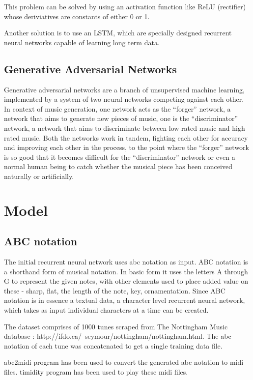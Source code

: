\documentclass[11pt]{article}
\begin{document}
This problem can be solved by using an activation function like ReLU (rectifier) whose deriviatives are constants of either 0 or 1.

Another solution is to use an LSTM, which are specially designed recurrent neural networks capable of learning long term data.

\subsection{Generative Adversarial Networks}
Generative adversarial networks are a branch of unsupervised machine learning, implemented by a system of two neural networks competing against each other. In context of music generation, one network acts as the “forger” network, a network that aims to generate new pieces of music, one is the “discriminator” network, a network that aims to discriminate between low rated music and high rated music. Both the networks work in tandem, fighting each other for accuracy and improving each other in the process, to the point where the “forger” network is so good that it becomes difficult for the “discriminator” network or even a normal human being to catch whether the musical piece has been conceived naturally or artificially.
\section{Model}
\subsection{ABC notation}
The initial recurrent neural network uses abc notation as input. ABC notation is a shorthand form of musical notation. In basic form it uses the letters A through G to represent the given notes, with other elements used to place added value on these - sharp, flat, the length of the note, key, ornamentation. Since ABC notation is in essence a textual data, a character level recurrent neural network, which takes as input individual characters at a time can be created.

The dataset comprises of 1000 tunes scraped from The Nottingham Music database : http://ifdo.ca/~seymour/nottingham/nottingham.html. The abc notation of each tune was concatenated to get a single training data file.

abc2midi program has been used to convert the generated abc notation to midi files. timidity program has been used to play these midi files.
\end{document}
